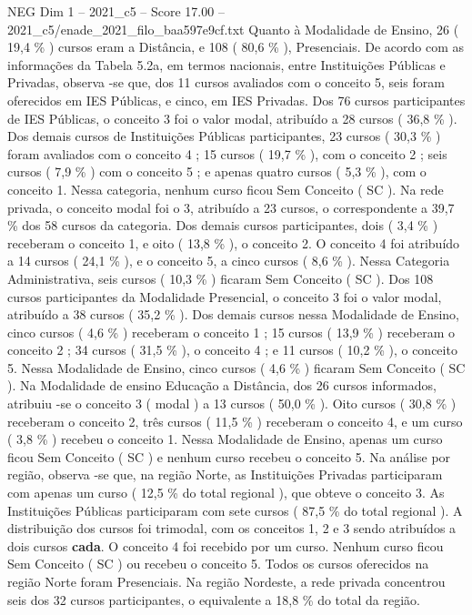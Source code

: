\begin{textsample}{NEG Dim 1 – 2021\_c5 – Score 17.00 – 2021\_c5/enade\_2021\_filo\_baa597e9cf.txt}
Quanto à Modalidade de Ensino, 26 ( 19,4 \% ) cursos eram a Distância, e 108 ( 80,6 \% ), Presenciais.
De acordo com as informações da Tabela 5.2a, em termos nacionais, entre Instituições Públicas e Privadas, observa -se que, dos 11 cursos avaliados com o conceito 5, seis foram oferecidos em IES Públicas, e cinco, em IES Privadas.
Dos 76 cursos participantes de IES Públicas, o conceito 3 foi o valor modal, atribuído a 28 cursos ( 36,8 \% ).
Dos demais cursos de Instituições Públicas participantes, 23 cursos ( 30,3 \% ) foram avaliados com o conceito 4 ; 15 cursos ( 19,7 \% ), com o conceito 2 ; seis cursos ( 7,9 \% ) com o conceito 5 ; e apenas quatro cursos ( 5,3 \% ), com o conceito 1.
Nessa categoria, nenhum curso ficou Sem Conceito ( SC ).
Na rede privada, o conceito modal foi o 3, atribuído a 23 cursos, o correspondente a 39,7 \% dos 58 cursos da categoria.
Dos demais cursos participantes, dois ( 3,4 \% ) receberam o conceito 1, e oito ( 13,8 \% ), o conceito 2.
O conceito 4 foi atribuído a 14 cursos ( 24,1 \% ), e o conceito 5, a cinco cursos ( 8,6 \% ).
Nessa Categoria Administrativa, seis cursos ( 10,3 \% ) ficaram Sem Conceito ( SC ).
Dos 108 cursos participantes da Modalidade Presencial, o conceito 3 foi o valor modal, atribuído a 38 cursos ( 35,2 \% ).
Dos demais cursos nessa Modalidade de Ensino, cinco cursos ( 4,6 \% ) receberam o conceito 1 ; 15 cursos ( 13,9 \% ) receberam o conceito 2 ; 34 cursos ( 31,5 \% ), o conceito 4 ; e 11 cursos ( 10,2 \% ), o conceito 5.
Nessa Modalidade de Ensino, cinco cursos ( 4,6 \% ) ficaram Sem Conceito ( SC ).
Na Modalidade de ensino Educação a Distância, dos 26 cursos informados, atribuiu -se o conceito 3 ( modal ) a 13 cursos ( 50,0 \% ).
Oito cursos ( 30,8 \% ) receberam o conceito 2, três cursos ( 11,5 \% ) receberam o conceito 4, e um curso ( 3,8 \% ) recebeu o conceito 1.
Nessa Modalidade de Ensino, apenas um curso ficou Sem Conceito ( SC ) e nenhum curso recebeu o conceito 5.
Na análise por região, observa -se que, na região Norte, as Instituições Privadas participaram com apenas um curso ( 12,5 \% do total regional ), que obteve o conceito 3.
As Instituições Públicas participaram com sete cursos ( 87,5 \% do total regional ).
A distribuição dos cursos foi trimodal, com os conceitos 1, 2 e 3 sendo atribuídos a dois cursos \textbf{cada}.
O conceito 4 foi recebido por um curso.
Nenhum curso ficou Sem Conceito ( SC ) ou recebeu o conceito 5.
Todos os cursos oferecidos na região Norte foram Presenciais.
Na região Nordeste, a rede privada concentrou seis dos 32 cursos participantes, o equivalente a 18,8 \% do total da região.

\end{textsample}
